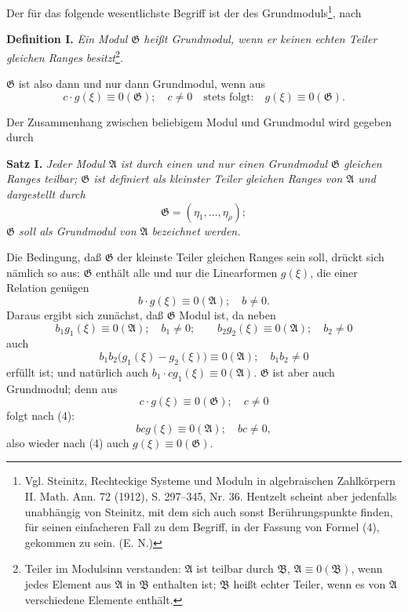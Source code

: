 \documentclass[11pt]{article}
\newcommand{\Amod}{\mathfrak A}
\newcommand{\Bmod}{\mathfrak B}
\newcommand{\Gmod}{\mathfrak G}
\newcommand{\zero}[1]{\equiv 0(#1)}
\begin{document}
Der für das folgende wesentlichste Begriff ist der des Grundmoduls\footnote{Vgl. Steinitz, Rechteckige Systeme und Moduln in algebraischen Zahlkörpern II. Math. Ann. 72 (1912), S. 297--345, Nr. 36. Hentzelt scheint aber jedenfalls unabhängig von Steinitz, mit dem sich auch sonst Berührungspunkte finden, für seinen einfacheren Fall zu dem Begriff, in der Fassung von Formel (4), gekommen zu sein. (E. N.)}, nach

\medskip
\noindent\textbf{Definition I.} \emph{Ein Modul $\Gmod$ heißt Grundmodul, wenn er keinen echten Teiler gleichen Ranges besitzt}\footnote{Teiler im Modulsinn verstanden: $\Amod$ ist teilbar durch $\Bmod$, $\Amod\zero{\Bmod}$, wenn jedes Element aus $\Amod$ in $\Bmod$ enthalten ist; $\Bmod$ heißt echter Teiler, wenn es von $\Amod$ verschiedene Elemente enthält.}.

$\Gmod$ ist also dann und nur dann Grundmodul, wenn aus
\begin{equation}
 c\cdot g(\xi)\zero{\Gmod};\quad c\ne0 \quad\text{stets folgt:}\quad g(\xi)\zero{\Gmod}.
\tag{2}
\end{equation}

Der Zusammenhang zwischen beliebigem Modul und Grundmodul wird gegeben durch

\medskip
\noindent\textbf{Satz I.} \emph{Jeder Modul $\Amod$ ist durch einen und nur einen Grundmodul $\Gmod$ gleichen Ranges teilbar; $\Gmod$ ist definiert als kleinster Teiler gleichen Ranges von $\Amod$ und dargestellt durch}
\begin{equation}
 \Gmod=(\eta_1,\ldots,\eta_\rho);
\tag{3}
\end{equation}
\emph{$\Gmod$ soll als Grundmodul von $\Amod$ bezeichnet werden.}

Die Bedingung, daß $\Gmod$ der kleinste Teiler gleichen Ranges sein soll, drückt sich nämlich so aus: $\Gmod$ enthält alle und nur die Linearformen $g(\xi)$, die einer Relation genügen
\begin{equation}
 b\cdot g(\xi)\zero{\Amod};\quad b\ne0.
\tag{4}
\end{equation}
Daraus ergibt sich zunächst, daß $\Gmod$ Modul ist, da neben
\[
 b_1g_1(\xi)\zero{\Amod};\quad b_1\ne0;
 \qquad
 b_2g_2(\xi)\zero{\Amod};\quad b_2\ne0
\]
auch
\[
 b_1b_2\bigl(g_1(\xi)-g_2(\xi)\bigr)\zero{\Amod};\quad b_1b_2\ne0
\]
erfüllt ist; und natürlich auch $b_1\cdot c g_1(\xi)\zero{\Amod}$. $\Gmod$ ist aber auch Grundmodul; denn aus
\[
 c\cdot g(\xi)\zero{\Gmod};\quad c\ne0
\]
folgt nach (4):
\[
 b c g(\xi)\zero{\Amod};\quad bc\ne0,
\]
also wieder nach (4) auch $g(\xi)\zero{\Gmod}$.
\end{document}
